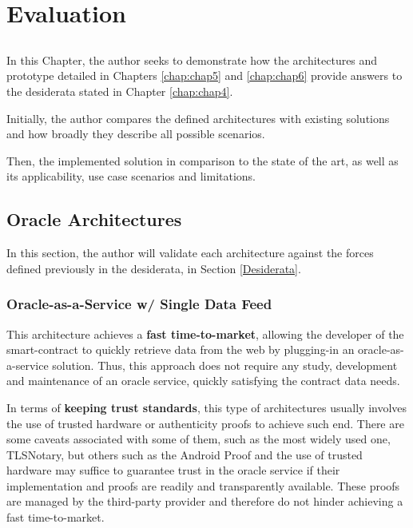 \chapter{Evaluation} \label{chap:chap7}

\section*{}
In this Chapter, the author seeks to demonstrate how the architectures and prototype detailed in Chapters \ref{chap:chap5} and \ref{chap:chap6} provide answers to the desiderata stated in Chapter \ref{chap:chap4}.

Initially, the author compares the defined architectures with existing solutions and how broadly they describe all possible scenarios.

Then, the implemented solution in comparison to the state of the art, as well as its applicability, use case scenarios and limitations.


\section{Oracle Architectures}
In this section, the author will validate each architecture against the forces defined previously in the desiderata, in Section \ref{Desiderata}.


\subsection{Oracle-as-a-Service w/ Single Data Feed}\label{OaaS w/SDF}
This architecture achieves a \textbf{fast time-to-market}, allowing the developer of the smart-contract to quickly retrieve data from the web by plugging-in an oracle-as-a-service solution. Thus, this approach does not require any study, development and maintenance of an oracle service, quickly satisfying the contract data needs.

In terms of \textbf{keeping trust standards}, this type of architectures usually involves the use of trusted hardware or authenticity proofs to achieve such end. There are some caveats associated with some of them, such as the most widely used one, TLSNotary, but others such as the Android Proof and the use of trusted hardware may suffice to guarantee trust in the oracle service if their implementation and proofs are readily and transparently available. These proofs are managed by the third-party provider and therefore do not hinder achieving a fast time-to-market.

